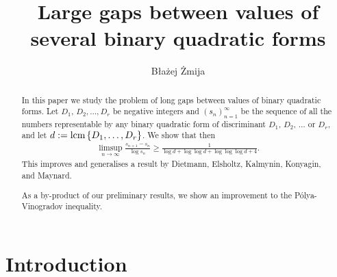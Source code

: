 \documentclass[a4paper]{amsart}
\title{Large gaps between values of several binary quadratic forms}
\author{B\l{}a\.zej \.Zmija}
\newcommand{\1}{\mathbbm{1}}
\newcommand{\lcm}{{\rm lcm}\hspace{0.05cm}}
\begin{document}
\begin{abstract}
In this paper we study the problem of long gaps between values of binary quadratic forms. Let $D_{1}$, $D_{2},\ldots ,D_{r}$ be negative integers and $(s_{n})_{n=1}^{\infty}$ be the sequence of all the numbers representable by any binary quadratic form of discriminant $D_{1}$, $D_{2}$, $\ldots$ or $D_{r}$, and let $d :=\lcm\{D_{1},\ldots ,D_{r}\}$. We show that then
\begin{align*}
\limsup_{n\to\infty}\frac{s_{n+1}-s_{n}}{\log s_{n}}\geq \frac{1}{\log d + \log\log d + \log\log\log d + 4}.
\end{align*}
This improves and generalises a result by Dietmann, Elsholtz, Kalmynin, Konyagin, and Maynard.

As a by-product of our preliminary results, we show an improvement to the Pólya-Vinogradov inequality.
\end{abstract}


\maketitle


\section{Introduction}
\end{document}
